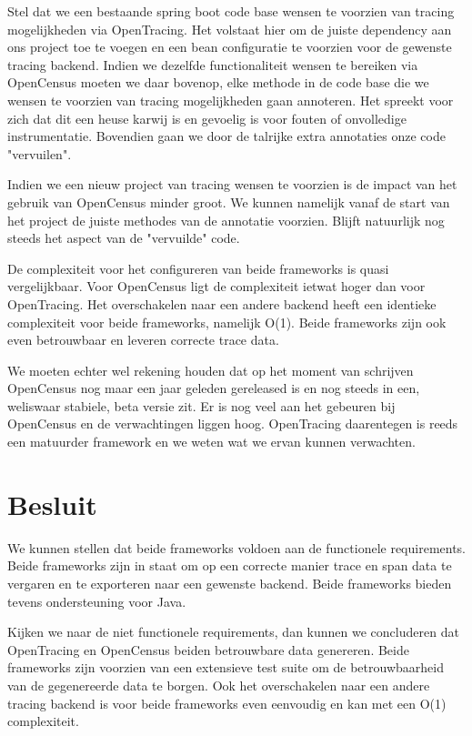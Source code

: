 Stel dat we een bestaande spring boot code base wensen te voorzien van tracing mogelijkheden via OpenTracing. Het volstaat hier om de juiste dependency aan ons project toe te voegen en een bean configuratie te voorzien voor de gewenste tracing backend. Indien we dezelfde functionaliteit wensen te bereiken via OpenCensus moeten we daar bovenop, elke methode in de code base die we wensen te voorzien van tracing mogelijkheden gaan annoteren. Het spreekt voor zich dat dit een heuse karwij is en gevoelig is voor fouten of onvolledige instrumentatie. Bovendien gaan we door de talrijke extra annotaties onze code "vervuilen".

Indien we een nieuw project van tracing wensen te voorzien is de impact van het gebruik van OpenCensus minder groot. We kunnen namelijk vanaf de start van het project de juiste methodes van de annotatie voorzien. Blijft natuurlijk nog steeds het aspect van de "vervuilde" code.

De complexiteit voor het configureren van beide frameworks is quasi vergelijkbaar. Voor OpenCensus ligt de complexiteit ietwat hoger dan voor OpenTracing. Het overschakelen naar een andere backend heeft een identieke complexiteit voor beide frameworks, namelijk O(1). Beide frameworks zijn ook even betrouwbaar en leveren correcte trace data.

We moeten echter wel rekening houden dat op het moment van schrijven OpenCensus nog maar een jaar geleden gereleased is en nog steeds in een, weliswaar stabiele, beta versie zit. Er is nog veel aan het gebeuren bij OpenCensus en de verwachtingen liggen hoog. OpenTracing daarentegen is reeds een matuurder framework en we weten wat we ervan kunnen verwachten.

\section{Besluit}
We kunnen stellen dat beide frameworks voldoen aan de functionele requirements. Beide frameworks zijn in staat om op een correcte manier trace en span data te vergaren en te exporteren naar een gewenste backend. Beide frameworks bieden tevens ondersteuning voor Java.

Kijken we naar de niet functionele requirements, dan kunnen we concluderen dat OpenTracing en OpenCensus beiden betrouwbare data genereren. Beide frameworks zijn voorzien van een extensieve test suite om de betrouwbaarheid van de gegenereerde data te borgen. Ook het overschakelen naar een andere tracing backend is voor beide frameworks even eenvoudig en kan met een O(1) complexiteit.


